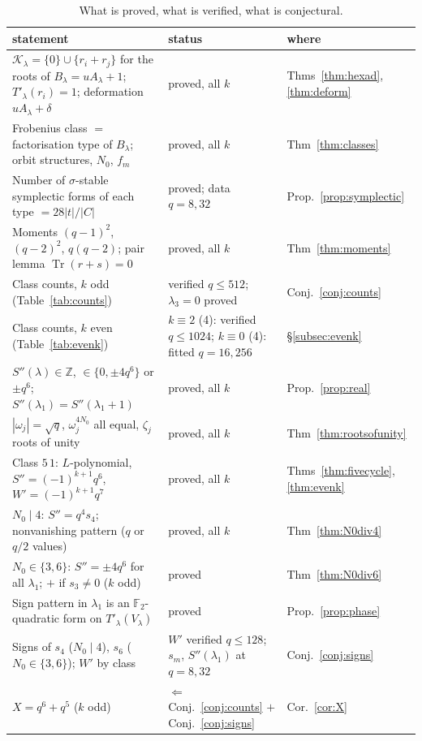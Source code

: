 ﻿\documentclass[12pt,a4paper]{amsart}
\theoremstyle{definition}
\newcommand{\F}{\mathbb{F}}
\newcommand{\Z}{\mathbb{Z}}
\newcommand{\Tr}{\operatorname{Tr}}
\newcommand{\Kk}{\mathcal{K}}
\newcommand{\Spp}{S''}
\begin{document}
\begin{table}[H]
\centering
\caption{What is proved, what is verified, what is conjectural.}\label{tab:status}
\footnotesize
\begin{tabular}{@{}p{}p{}p{}@{}}
\toprule
statement & status & where\\
\midrule
$\Kk_\lambda=\{0\}\cup\{r_i+r_j\}$ for the roots of $B_\lambda=uA_\lambda+1$; $T'_\lambda(r_i)=1$; deformation $uA_\lambda+\delta$ & proved, all $k$ & Thms~\ref{thm:hexad}, \ref{thm:deform}\\
Frobenius class $=$ factorisation type of $B_\lambda$; orbit structures, $N_0$, $f_m$ & proved, all $k$ & Thm~\ref{thm:classes}\\
Number of $\sigma$-stable symplectic forms of each type $=28|t|/|C|$ & proved; data $q=8,32$ & Prop.~\ref{prop:symplectic}\\
Moments $(q-1)^2$, $(q-2)^2$, $q(q-2)$; pair lemma $\Tr(r+s)=0$ & proved, all $k$ & Thm~\ref{thm:moments}\\
Class counts, $k$ odd (Table~\ref{tab:counts}) & verified $q\le512$; $\lambda_3=0$ proved & Conj.~\ref{conj:counts}\\
Class counts, $k$ even (Table~\ref{tab:evenk}) & $k\equiv2$ (4): verified $q\le1024$; $k\equiv0$ (4): fitted $q=16,256$ & \S\ref{subsec:evenk}\\
$\Spp(\lambda)\in\Z$, $\in\{0,\pm4q^6\}$ or $\pm q^6$; $\Spp(\lambda_1)=\Spp(\lambda_1+1)$ & proved, all $k$ & Prop.~\ref{prop:real}\\
$|\omega_j|=\sqrt q$, $\omega_j^{4N_0}$ all equal, $\zeta_j$ roots of unity & proved, all $k$ & Thm~\ref{thm:rootsofunity}\\
Class $5\,1$: $L$-polynomial, $\Spp=(-1)^{k+1}q^6$, $W'=(-1)^{k+1}q^7$ & proved, all $k$ & Thms~\ref{thm:fivecycle}, \ref{thm:evenk}\\
$N_0\mid4$: $\Spp=q^4s_4$; nonvanishing pattern ($q$ or $q/2$ values) & proved, all $k$ & Thm~\ref{thm:N0div4}\\
$N_0\in\{3,6\}$: $\Spp=\pm4q^6$ for all $\lambda_1$; $+$ if $s_3\ne0$ ($k$ odd) & proved & Thm~\ref{thm:N0div6}\\
Sign pattern in $\lambda_1$ is an $\F_2$-quadratic form on $T'_\lambda(V_\lambda)$ & proved & Prop.~\ref{prop:phase}\\
Signs of $s_4$ ($N_0\mid4$), $s_6$ ($N_0\in\{3,6\}$); $W'$ by class & $W'$ verified $q\le128$; $s_m$, $\Spp(\lambda_1)$ at $q=8,32$ & Conj.~\ref{conj:signs}\\
$X=q^6+q^5$ ($k$ odd) & $\Leftarrow$ Conj.~\ref{conj:counts} $+$ Conj.~\ref{conj:signs} & Cor.~\ref{cor:X}\\
\bottomrule
\end{tabular}
\end{table}
\end{document}
